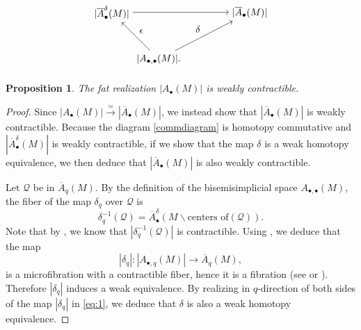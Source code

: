 \documentclass[a4paper]{amsart}
\newtheorem{prop}[thm]{Proposition}
\theoremstyle{definition}
\theoremstyle{remark}
\numberwithin{equation}{section}
\begin{document}
 \begin{equation}\label{commdiagram}\begin{gathered}
  \begin{tikzpicture}[node distance=2.5cm, auto]
  \node (A) {$|\overline{A}^{\delta}_{\bullet}(M)|$};
  \node (B) [right of=A, below of=A, node distance=1.7cm]{$|A_{\bullet,\bullet}(M)|.$};
  \node (C) [right of=A, node distance=5cm]{$|\overline{A}_{\bullet}(M)|$};
  \draw [->] (A) to node {$$} (C);
  \draw [->] (B) to node {$\delta$} (C);
  \draw [<-] (A) to node {$\epsilon$} (B);
 \end{tikzpicture}
\end{gathered}
\end{equation}
\begin{prop}\label{claim1}
The fat realization $|A_{\bullet}(M)|$ is weakly contractible.
\end{prop}
\begin{proof}
Since $|A_{\bullet}(M)|\xrightarrow{\simeq}|\overline{A}_{\bullet}(M)|$, we instead show that $|\overline{A}_{\bullet}(M)|$ is weakly contractible. Because the diagram \ref{commdiagram} is homotopy commutative and $|\overline{A}^{\delta}_{\bullet}(M)|$ is weakly contractible, if we show that the map $\delta$ is a weak homotopy equivalence, we then deduce that $|\overline{A}_{\bullet}(M)|$ is also weakly contractible.

Let $\mathcal{Q}$ be in $\overline{A}_{q}(M)$. By the definition of the bisemisimplicial space $A_{\bullet,\bullet}(M)$, the fiber of the map $\delta_q$ over $\mathcal{Q}$ is
\[
\delta_q^{-1}(\mathcal{Q})=\overline{A}_{\bullet}^{\delta}(M\backslash \text{centers of}(\mathcal{Q})).
\]
Note that by , we know that $|\delta_q^{-1}(\mathcal{Q})|$ is contractible. Using \cite[Proposition 2.8]{galatius2014homological}, we deduce that the map \begin{equation}\label{eq:1}|\delta_q|:|A_{\bullet,q}(M)|\to \overline{A}_{q}(M),\end{equation} is a microfibration with a contractible fiber, hence it is a fibration (see \cite[Lemma 2.2]{weiss2005does} or \cite[Proposition 2.6]{galatius2014homological}). Therefore $|\delta_q|$ induces a weak equivalence. By realizing in $q$-direction of both sides of the map $|\delta_q|$ in \ref{eq:1}, we deduce that $\delta$ is also a weak homotopy equivalence.
\end{proof}
\end{document}
